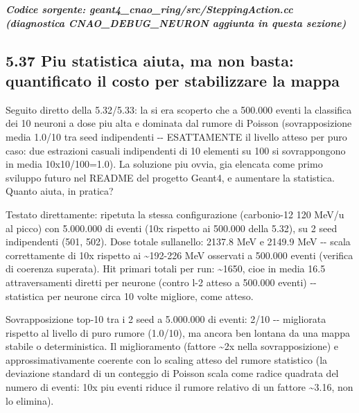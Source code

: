 \documentclass[
  italian,
]{article}
\begin{document}
\textit{\textbf{Codice sorgente: geant4\_\allowbreak{}cnao\_\allowbreak{}ring/src/SteppingAction.cc (diagnostica CNAO\_\allowbreak{}DEBUG\_\allowbreak{}NEURON aggiunta in questa sezione)}}


\subsection{5.37 Piu\textquotesingle{} statistica aiuta, ma non basta: quantificato il costo per stabilizzare la mappa}\label{piu-statistica-aiuta-ma-non-basta-quantificato-il-costo-per-stabilizzare-la-mappa}

Seguito diretto della 5.32/5.33: la\textquotesingle{} si era scoperto che a 500.000 eventi la classifica dei 10 neuroni a dose piu\textquotesingle{} alta e\textquotesingle{} dominata dal rumore di Poisson (sovrapposizione media 1.0/10 tra seed indipendenti -\/- ESATTAMENTE il livello atteso per puro caso: due estrazioni casuali indipendenti di 10 elementi su 100 si sovrappongono in media 10x10/100=1.0). La soluzione piu\textquotesingle{} ovvia, gia\textquotesingle{} elencata come primo sviluppo futuro nel README del progetto Geant4, e\textquotesingle{} aumentare la statistica. Quanto aiuta, in pratica?

Testato direttamente: ripetuta la stessa configurazione (carbonio-12 120 MeV/u al picco) con 5.000.000 di eventi (10x rispetto ai 500.000 della 5.32), su 2 seed indipendenti (501, 502). Dose totale sull\textquotesingle anello: 2137.8 MeV e 2149.9 MeV -\/- scala correttamente di 10x rispetto ai \textasciitilde192-226 MeV osservati a 500.000 eventi (verifica di coerenza superata). Hit primari totali per run: \textasciitilde1650, cioe\textquotesingle{} in media 16.5 attraversamenti diretti per neurone (contro l-2 atteso a 500.000 eventi) -\/- statistica per neurone circa 10 volte migliore, come atteso.

Sovrapposizione top-10 tra i 2 seed a 5.000.000 di eventi: 2/10 -\/- migliorata rispetto al livello di puro rumore (1.0/10), ma ancora ben lontana da una mappa stabile o deterministica. Il miglioramento (fattore \textasciitilde2x nella sovrapposizione) e\textquotesingle{} approssimativamente coerente con lo scaling atteso del rumore statistico (la deviazione standard di un conteggio di Poisson scala come radice quadrata del numero di eventi: 10x piu\textquotesingle{} eventi riduce il rumore relativo di un fattore \textasciitilde3.16, non lo elimina).
\end{document}
